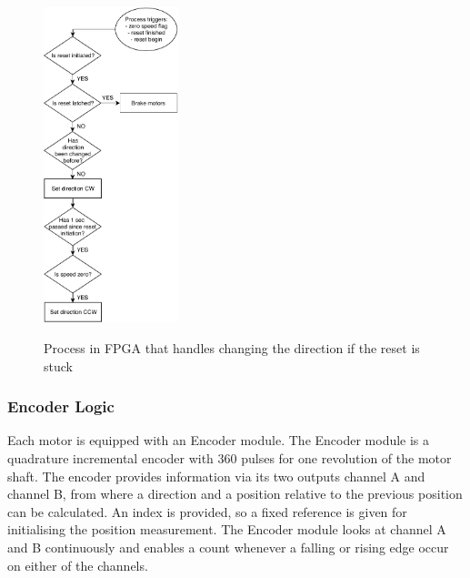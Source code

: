 \documentclass[../../main.tex]{subfiles}
\begin{document}
\begin{figure}
\centering
\caption{Process in FPGA that handles changing the direction if the reset is stuck}
\includegraphics[width = 0.35\textwidth]{Sections/System_Implementation/Images/FPGAFlowchartsResetDirection.pdf}
\label{fig:FPGAFlowchartsResetDirection}
\end{figure}

\subsubsection*{Encoder Logic}

Each motor is equipped with an Encoder module. The Encoder module is a quadrature incremental encoder with 360 pulses for one revolution of the motor shaft. The encoder provides information via its two outputs channel A and channel B, from where a direction and a position relative to the previous position can be calculated. An index is provided, so a fixed reference is given for initialising the position measurement. The Encoder module looks at channel A and B continuously and enables a count whenever a falling or rising edge occur on either of the channels. %


\end{document}
